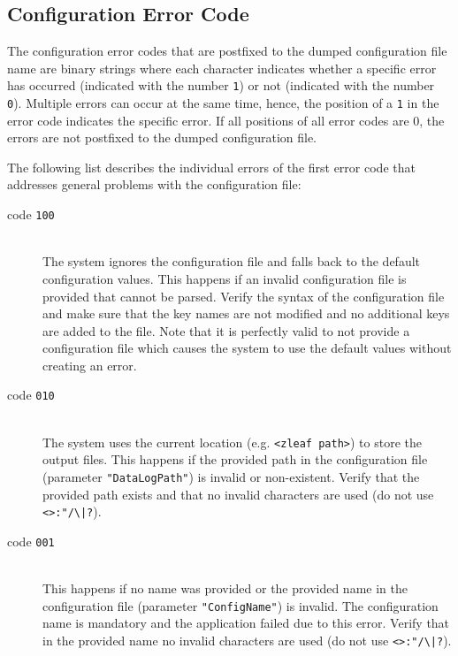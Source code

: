 \documentclass[a4paper,oneside]{book}
\begin{document}
\subsection{Configuration Error Code}
\label{sect.config.error}
The configuration error codes that are postfixed to the dumped configuration file name are binary strings where each character indicates whether a specific error has occurred (indicated with the number \texttt{1}) or not (indicated with the number \texttt{0}).
Multiple errors can occur at the same time, hence, the position of a \texttt{1} in the error code indicates the specific error.
If all positions of all error codes are 0, the errors are not postfixed to the dumped configuration file.

The following list describes the individual errors of the first error code that addresses general problems with the configuration file:
\begin{description}
    \item[code \texttt{100}] \hfill \\
        The system ignores the configuration file and falls back to the default configuration values.
        This happens if an invalid configuration file is provided that cannot be parsed.
        Verify the syntax of the configuration file and make sure that the key names are not modified and no additional keys are added to the file.
        Note that it is perfectly valid to not provide a configuration file which causes the system to use the default values without creating an error.
    \item[code \texttt{010}] \hfill \\
        The system uses the current location (e.g. \texttt{<zleaf path>}) to store the output files.
        This happens if the provided path in the configuration file (parameter \texttt{"DataLogPath"}) is invalid or non-existent.
        Verify that the provided path exists and that no invalid characters are used (do not use \texttt{<>:"/\textbackslash |?}).
    \item[code \texttt{001}] \hfill \\
        This happens if no name was provided or the provided name in the configuration file (parameter \texttt{"ConfigName"}) is invalid.
        The configuration name is mandatory and the application failed due to this error.
        Verify that in the provided name no invalid characters are used (do not use \texttt{<>:"/\textbackslash |?}).
\end{description}
\end{document}

